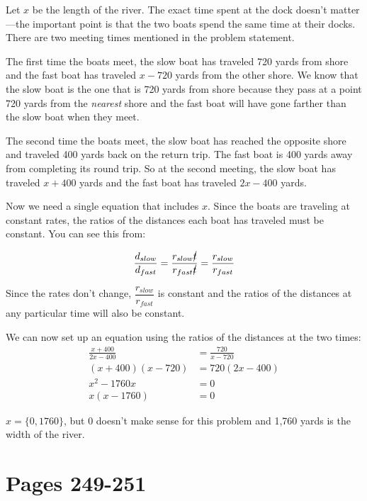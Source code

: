 \documentclass[fleqn,addpoints]{exam}
\begin{document}
\begin{solution}

Let $x$ be the length of the river. The exact time spent at the dock doesn't matter---the important point is that the two
boats spend the same time at their docks.  There are two meeting times mentioned in the problem statement.  

The first time the boats meet, the slow boat has traveled 720 yards from shore and the fast boat has traveled $x-720$ yards
from the other shore.  We know that the slow boat is the one that is 720 yards from shore because they pass at a point
720 yards from the {\em nearest} shore and the fast boat will have gone farther than the slow boat when they meet.

The second time the boats meet, the slow boat has reached the opposite shore and traveled 400 yards back on the return trip.  The fast boat
is 400 yards away from completing its round trip.  So at the second meeting, the slow boat has traveled $x+400$ yards and
the fast boat has traveled $2x-400$ yards.

Now we need a single equation that includes $x$.  Since the boats are traveling at constant rates, the ratios of the
distances each boat has traveled must be constant.  You can see this from:

\[
   \frac{d_{slow}}{d_{fast}} = \frac{r_{slow}\cancel{t}}{r_{fast} \cancel{t}} = \frac{r_{slow}}{r_{fast}}
\]

Since the rates don't change, $\dfrac{r_{slow}}{r_{fast}}$ is constant and the ratios of the distances at any particular
time will also be constant.  

We can now set up an equation using the ratios of the distances at the two times:
\begin{align*}
  \frac{x+400}{2x-400} &= \frac{720}{x-720} \\
  (x+400)(x-720) &= 720(2x-400) \\
  x^2-1760x &= 0 \\
  x(x-1760) &= 0 
\end{align*}

$x = \{0, 1760\}$, but 0 doesn't make sense for this problem and 1,760 yards is the width of the river.

\end{solution}

\ifprintanswers

\section{Pages 249-251}
\end{document}
